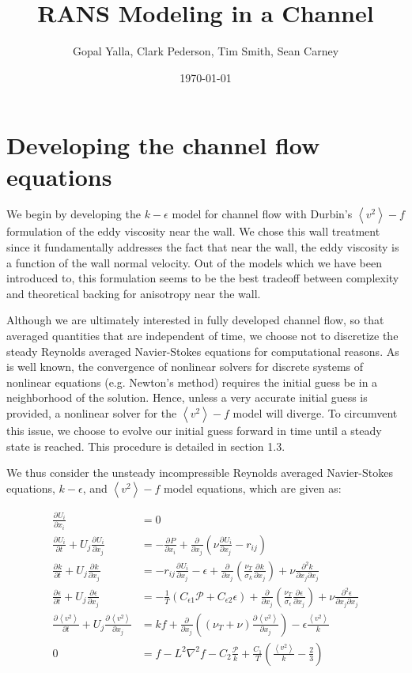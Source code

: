 \documentclass[a4paper,11pt]{article}
\title{\vspace{-4ex}RANS Modeling in a Channel}
\author{Gopal Yalla, Clark Pederson, Tim Smith, Sean Carney}
\date{\today}
\newcommand{\chevron}[1]{\left\langle #1 \right\rangle}
\newcommand{\pderiv}[3][]{%
  \ensuremath{\frac{\partial^{#1} {#2}}{\partial {#3}^{#1}}}}
\begin{document}
\maketitle
\section{Developing the channel flow equations}

We begin by developing the $k-\epsilon$ model for channel flow with Durbin's
$\chevron{v^2}-f$ formulation of the eddy viscosity near
the wall. We chose this wall treatment since it fundamentally
addresses the fact that near the wall, the eddy viscosity is a function of the
wall normal velocity. Out of the models which we have been introduced to, this
formulation seems to be the best tradeoff between complexity and theoretical
backing for anisotropy near the wall.    

Although we are ultimately interested in fully developed channel flow, so that averaged quantities that are independent of time, we choose not to discretize the steady Reynolds averaged Navier-Stokes equations for computational reasons. As is well known, the convergence of nonlinear solvers for discrete systems of nonlinear equations (e.g. Newton's method) requires the initial guess be in a neighborhood of the solution. Hence, unless a very accurate initial guess is provided, a nonlinear solver for the $\chevron{v^2}-f$ model will diverge. To circumvent this issue, we choose to evolve our initial guess forward in time until a steady state is reached. This procedure is detailed in section 1.3. 

We thus consider the unsteady incompressible Reynolds averaged Navier-Stokes equations, 
$k-\epsilon$, and $\chevron{v^2}-f$ model equations, which are given as:

\begin{align}
\pderiv{U_i}{x_i} &= 0 \label{eq:continuity} \\
\pderiv{U_i}{t} + U_j\pderiv{U_i}{x_j} &= -\pderiv{P}{x_i} +
\pderiv{}{x_j}\left(\nu\pderiv{U_i}{x_j} - r_{ij}\right) \\
\pderiv{k}{t} + U_j\pderiv{k}{x_j} &= -r_{ij}\pderiv{U_i}{x_j} - \epsilon +
\pderiv{}{x_j}\left(\frac{\nu_T}{\sigma_k}\pderiv{k}{x_j}\right) +
\nu\frac{\partial^2 k}{\partial x_j \partial x_j} \\
\pderiv{\epsilon}{t} + U_j\pderiv{\epsilon}{x_j} &=
-\frac{1}{T}\left(C_{\epsilon 1} \mathcal{P} + C_{\epsilon 2} \epsilon\right) +
\pderiv{}{x_j}\left(\frac{\nu_T}{\sigma_\epsilon}\pderiv{\epsilon}{x_j}\right) +
\nu\frac{\partial^2 \epsilon}{\partial x_j \partial x_j} \\
\pderiv{\chevron{v^2}}{t} + U_j\pderiv{\chevron{v^2}}{x_j} &= kf +
\pderiv{}{x_j}\left((\nu_T+\nu)\pderiv{\chevron{v^2}}{x_j}\right) - \epsilon
\frac{\chevron{v^2}}{k} \\
0 &=  f -  L^2 \nabla^2 f  -C_2 \frac{\mathcal{P}}{k} + \frac{C_1}{T} \left(
\frac{\chevron{v^2}}{k} - \frac{2}{3} \right) 
\label{eq:redistribution}
\end{align}
\end{document}
